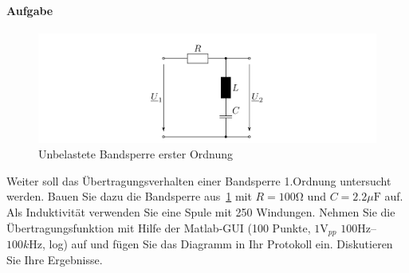 \documentclass[10pt]{scrreprt}
\begin{document}
    \paragraph{Aufgabe}
    \begin{center}
        \begin{figure}[H]
            \includegraphics[width=\textwidth]{abb19.png}
            \caption{Unbelastete Bandsperre erster Ordnung}
            \label{fig:abb19}
        \end{figure}
    \end{center}
    Weiter soll das Übertragungsverhalten einer Bandsperre 1.Ordnung untersucht werden.
    Bauen Sie dazu die Bandsperre aus~\ref{fig:abb19} mit $R = 100 \si{\ohm}$ und $C = 2.2 \si{\mu\farad}$ auf. Als
    Induktivität verwenden Sie eine Spule mit 250 Windungen.
    Nehmen Sie die Übertragungsfunktion mit Hilfe der Matlab-GUI (100 Punkte, $1\si{\volt}_{pp}$
    $100\si{\hertz}$–$100\si{k\hertz}$, log) auf und fügen Sie das Diagramm in Ihr Protokoll ein. Diskutieren
    Sie Ihre Ergebnisse.
\end{document}

